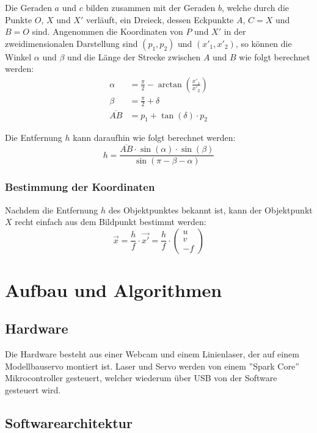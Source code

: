 \documentclass[ngerman,a4paper,parskip=half]{scrartcl}
\begin{document}
Die Geraden $a$ und $c$ bilden zusammen mit der Geraden $b$, welche durch die Punkte $O$, $X$ und $X'$ verläuft, ein Dreieck, dessen Eckpunkte $A$, $C = X$ und $B = O$ sind. Angenommen die Koordinaten von $P$ und $X'$ in der zweidimensionalen Darstellung sind $(p_1,p_2)$ und $(x'_1, x'_2)$, so können die Winkel $\alpha$ und $\beta$ und die Länge der Strecke zwischen $A$ und $B$ wie folgt berechnet werden:
\begin{align*}
	\alpha &= \frac{\pi}{2} - \arctan\left(\frac{x'_1}{x'_2}\right)\\
	\beta &= \frac{\pi}{2} + \delta\\
	\overline{AB} &= p_1 + \tan(\delta) \cdot p_2
\end{align*}

Die Entfernung $h$ kann daraufhin wie folgt berechnet werden:
\[ h = \frac{\overline{AB} \cdot \sin(\alpha) \cdot \sin(\beta)}{\sin(\pi - \beta - \alpha)} \]

\subsubsection{Bestimmung der Koordinaten}

Nachdem die Entfernung $h$ des Objektpunktes bekannt ist, kann der Objektpunkt $X$ recht einfach aus dem Bildpunkt bestimmt werden:
\[ \vec{x} = \frac{h}{f} \cdot \vec{x'} = \frac{h}{f} \cdot \begin{pmatrix}
u \\ v \\ -f
\end{pmatrix} \]


\section{Aufbau und Algorithmen}

\subsection{Hardware}

Die Hardware besteht aus einer Webcam und einem Linienlaser, der auf einem Modellbauservo montiert ist. Laser und Servo werden von einem ''Spark Core'' Mikrocontroller gesteuert, welcher wiederum über USB von der Software gesteuert wird.

\subsection{Softwarearchitektur}
\end{document}
